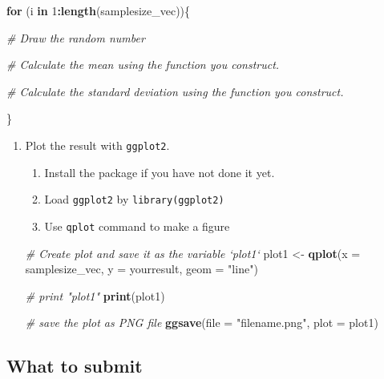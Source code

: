 \documentclass[]{book}
\newenvironment{Shaded}{\begin{snugshade}}{\end{snugshade}}
\newcommand{\CommentTok}[1]{\textcolor[rgb]{0.56,0.35,0.01}{\textit{#1}}}
\newcommand{\ControlFlowTok}[1]{\textcolor[rgb]{0.13,0.29,0.53}{\textbf{#1}}}
\newcommand{\DataTypeTok}[1]{\textcolor[rgb]{0.13,0.29,0.53}{#1}}
\newcommand{\DecValTok}[1]{\textcolor[rgb]{0.00,0.00,0.81}{#1}}
\newcommand{\KeywordTok}[1]{\textcolor[rgb]{0.13,0.29,0.53}{\textbf{#1}}}
\newcommand{\NormalTok}[1]{#1}
\newcommand{\OperatorTok}[1]{\textcolor[rgb]{0.81,0.36,0.00}{\textbf{#1}}}
\newcommand{\StringTok}[1]{\textcolor[rgb]{0.31,0.60,0.02}{#1}}
\providecommand{\tightlist}{%
  \setlength{\itemsep}{0pt}\setlength{\parskip}{0pt}}
\begin{document}
\begin{Shaded}
\begin{Highlighting}[]
\ControlFlowTok{for}\NormalTok{ (i }\ControlFlowTok{in} \DecValTok{1}\OperatorTok{:}\KeywordTok{length}\NormalTok{(samplesize_vec))\{}
  
  \CommentTok{# Draw the random number}
  
  \CommentTok{# Calculate the mean using the function you construct. }
  
  \CommentTok{# Calculate the standard deviation using the function you construct.}
  
\NormalTok{\}}
\end{Highlighting}
\end{Shaded}

\begin{enumerate}
\def\labelenumi{\arabic{enumi}.}
\setcounter{enumi}{4}
\tightlist
\item
  Plot the result with \texttt{ggplot2}.

  \begin{enumerate}
  \def\labelenumii{\arabic{enumii}.}
  \tightlist
  \item
    Install the package if you have not done it yet.
  \item
    Load \texttt{ggplot2} by \texttt{library(ggplot2)}
  \item
    Use \texttt{qplot} command to make a figure
  \end{enumerate}

\begin{Shaded}
\begin{Highlighting}[]
\CommentTok{# Create plot and save it as the variable `plot1`}
\NormalTok{plot1 <-}\StringTok{ }\KeywordTok{qplot}\NormalTok{(}\DataTypeTok{x =}\NormalTok{ samplesize_vec, }\DataTypeTok{y =}\NormalTok{ yourresult, }\DataTypeTok{geom =} \StringTok{"line"}\NormalTok{)}

\CommentTok{# print "plot1"}
\KeywordTok{print}\NormalTok{(plot1)}

\CommentTok{# save the plot as PNG file}
\KeywordTok{ggsave}\NormalTok{(}\DataTypeTok{file =} \StringTok{"filename.png"}\NormalTok{, }\DataTypeTok{plot =}\NormalTok{ plot1)}
\end{Highlighting}
\end{Shaded}
\end{enumerate}

\hypertarget{what-to-submit}{%
\subsection{What to submit}\label{what-to-submit}}
\end{document}
